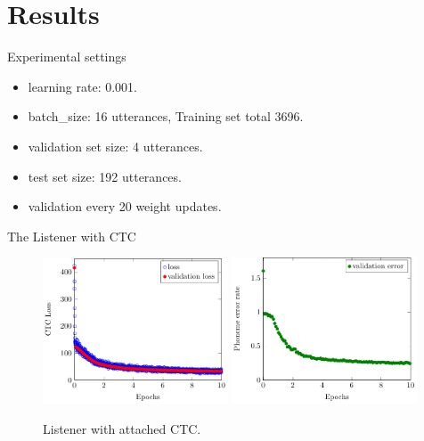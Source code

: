 \documentclass{beamer}
\begin{document}
\section{Results}

\begin{frame}{Experimental settings}

\begin{itemize}
	\item learning rate: 0.001.
	\item batch\_size: 16 utterances, Training set total 3696.
	\item validation set size: 4 utterances.
	\item test set size: 192 utterances.
	\item validation every 20 weight updates.
\end{itemize}

\end{frame}

\begin{frame}{The Listener with CTC}
	\begin{figure}
		\includegraphics[width=0.49\textwidth]{../tikz/CTC_Listener_plot_e10_loss}
		\includegraphics[width=0.49\textwidth]{../tikz/CTC_Listener_plot_e10_error}
		\caption{Listener with attached CTC.}
	\end{figure}
\end{frame}
\end{document}
